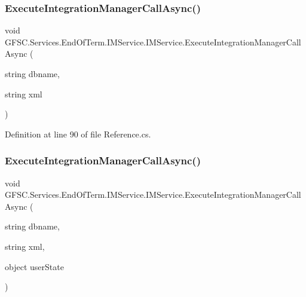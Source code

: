 \subsubsection{\texorpdfstring{Execute\+Integration\+Manager\+Call\+Async()}{ExecuteIntegrationManagerCallAsync()}\hspace{0.1cm}{\footnotesize\ttfamily [1/2]}}
{\footnotesize\ttfamily void G\+F\+S\+C.\+Services.\+End\+Of\+Term.\+I\+M\+Service.\+I\+M\+Service.\+Execute\+Integration\+Manager\+Call\+Async (\begin{DoxyParamCaption}\item[{string}]{dbname,  }\item[{string}]{xml }\end{DoxyParamCaption})}







Definition at line 90 of file Reference.\+cs.

\mbox{\label{class_g_f_s_c_1_1_services_1_1_end_of_term_1_1_i_m_service_1_1_i_m_service_a37d60d9cec4bef330aa866696c06b5c5}} 
\subsubsection{\texorpdfstring{Execute\+Integration\+Manager\+Call\+Async()}{ExecuteIntegrationManagerCallAsync()}\hspace{0.1cm}{\footnotesize\ttfamily [2/2]}}
{\footnotesize\ttfamily void G\+F\+S\+C.\+Services.\+End\+Of\+Term.\+I\+M\+Service.\+I\+M\+Service.\+Execute\+Integration\+Manager\+Call\+Async (\begin{DoxyParamCaption}\item[{string}]{dbname,  }\item[{string}]{xml,  }\item[{object}]{user\+State }\end{DoxyParamCaption})}







